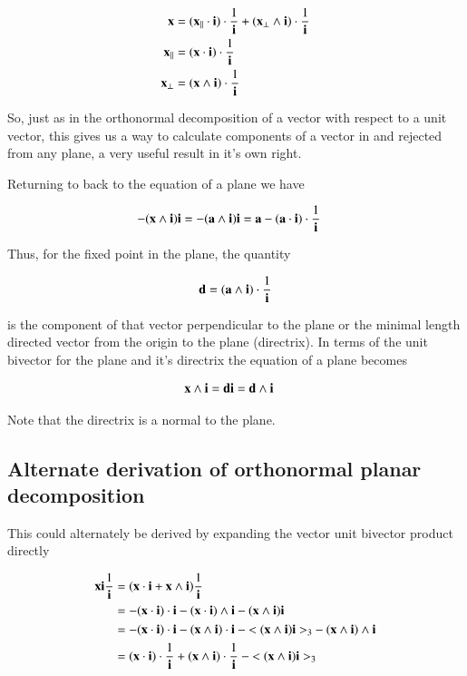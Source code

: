 \documentclass{article}
\begin{document}
\begin{align*}
\mathbf{x} 
&= 
(\mathbf{x}_\parallel \cdot \mathbf{i}) \cdot \frac{1}{\mathbf{i}} + (\mathbf{x}_\perp \wedge \mathbf{i}) \cdot \frac{1}{\mathbf{i}} \\
\mathbf{x}_\parallel &= (\mathbf{x} \cdot \mathbf{i}) \cdot \frac{1}{\mathbf{i}} \\
\mathbf{x}_\perp &= (\mathbf{x} \wedge \mathbf{i}) \cdot \frac{1}{\mathbf{i}} \\
\end{align*}

So, just as in the orthonormal decomposition of a vector with respect to a
unit vector, this gives us a way to calculate components of a vector
in and rejected from any plane, a very useful result in it's own right.

Returning to back to the equation of a plane we have

\begin{align*}
- (\mathbf{x} \wedge \mathbf{i})\mathbf{i} &= - (\mathbf{a} \wedge \mathbf{i})\mathbf{i} = \mathbf{a} - (\mathbf{a} \cdot \mathbf{i}) \cdot \frac{1}{\mathbf{i}}
\end{align*}

Thus, for the fixed point in the plane, the quantity

\[
\mathbf{d} = (\mathbf{a} \wedge \mathbf{i}) \cdot \frac{1}{\mathbf{i}}
\]

is the component of that vector perpendicular to the plane or the minimal length directed vector from the origin to the plane (directrix).  In terms 
of the unit bivector for the plane and it's directrix the equation of a 
plane becomes

\begin{align*}
\mathbf{x} \wedge \mathbf{i} &= \mathbf{d} \mathbf{i} = \mathbf{d} \wedge \mathbf{i}
\end{align*}

Note that the directrix is a normal to the plane.

\subsection{ Alternate derivation of orthonormal planar decomposition }

This could alternately be derived by expanding the vector unit bivector
product directly

\begin{align*}
\mathbf{x} \mathbf{i} \frac{1}{\mathbf{i}} 
&= ( \mathbf{x} \cdot \mathbf{i} + \mathbf{x} \wedge \mathbf{i} ) \frac{1}{\mathbf{i}} \\
&= 
- {(\mathbf{x} \cdot \mathbf{i}) \cdot \mathbf{i}} - {(\mathbf{x} \cdot \mathbf{i}) \wedge \mathbf{i}} - {(\mathbf{x} \wedge \mathbf{i}) \mathbf{i}} \\
&= 
- {(\mathbf{x} \cdot \mathbf{i}) \cdot \mathbf{i}} - {(\mathbf{x} \wedge \mathbf{i}) \cdot \mathbf{i} } - {<(\mathbf{x} \wedge \mathbf{i}) \mathbf{i}>_3} - {(\mathbf{x} \wedge \mathbf{i}) \wedge \mathbf{i}} \\
&= 
{(\mathbf{x} \cdot \mathbf{i}) \cdot \frac{1}{\mathbf{i}}} + {(\mathbf{x} \wedge \mathbf{i}) \cdot \frac{1}{\mathbf{i}}} - {<(\mathbf{x} \wedge \mathbf{i}) \mathbf{i}>_3} \\
\end{align*}
\end{document}
